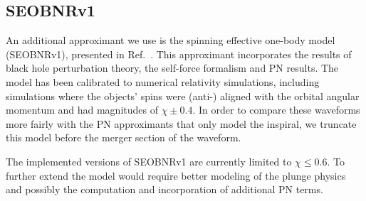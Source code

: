 %

\subsection{SEOBNRv1}

An additional approximant we use is the spinning effective one-body model
(SEOBNRv1), presented in Ref.~\cite{Taracchini:2012ig}.  This approximant
incorporates the results of black hole perturbation theory, the self-force
formalism and \ac{PN} results. The model has been calibrated to numerical
relativity simulations, including simulations where the objects' spins were
(anti-) aligned with the orbital angular momentum and had magnitudes of $\chi
\pm 0.4$.  In order to compare these waveforms more fairly with the \ac{PN}
approximants that only model the inspiral, we truncate this model before the
merger section of the waveform.

The implemented versions of SEOBNRv1 are currently limited to $\chi \leq 0.6$.
To further extend the model would require better modeling of the plunge physics
and possibly the computation and incorporation of additional \ac{PN} terms.

